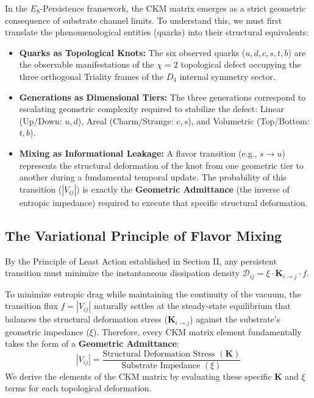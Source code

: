 In the $E_8$-Persistence framework, the CKM matrix emerges as a strict geometric consequence of substrate channel limits. To understand this, we must first translate the phenomenological entities (quarks) into their structural equivalents:
\begin{itemize}
    \item \textbf{Quarks as Topological Knots:} The six observed quarks ($u, d, c, s, t, b$) are the observable manifestations of the $\chi=2$ topological defect occupying the three orthogonal Triality frames of the $D_4$ internal symmetry sector. 
    \item \textbf{Generations as Dimensional Tiers:} The three generations correspond to escalating geometric complexity required to stabilize the defect: Linear (Up/Down: $u, d$), Areal (Charm/Strange: $c, s$), and Volumetric (Top/Bottom: $t, b$).
    \item \textbf{Mixing as Informational Leakage:} A flavor transition (e.g., $s \rightarrow u$) represents the structural deformation of the knot from one geometric tier to another during a fundamental temporal update. The probability of this transition ($|V_{ij}|$) is exactly the \textbf{Geometric Admittance} (the inverse of entropic impedance) required to execute that specific structural deformation.
\end{itemize}

\subsection{The Variational Principle of Flavor Mixing}
By the Principle of Least Action established in Section II, any persistent transition must minimize the instantaneous dissipation density $\mathcal{D}_{ij} = \xi \cdot \mathbf{K}_{i \to j} \cdot f$. 

To minimize entropic drag while maintaining the continuity of the vacuum, the transition flux $f = |V_{ij}|$ naturally settles at the steady-state equilibrium that balances the structural deformation stress ($\mathbf{K}_{i \to j}$) against the substrate's geometric impedance ($\xi$). Therefore, every CKM matrix element fundamentally takes the form of a \textbf{Geometric Admittance}:
\begin{equation}
    |V_{ij}| = \frac{\text{Structural Deformation Stress } (\mathbf{K})}{\text{Substrate Impedance } (\xi)}
\end{equation}
We derive the elements of the CKM matrix by evaluating these specific $\mathbf{K}$ and $\xi$ terms for each topological deformation.


